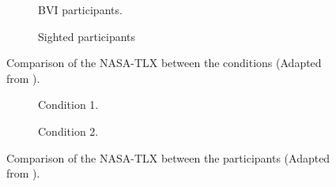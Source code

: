 \begin{figure}[htbp]
    \centering
    \begin{subfigure}{.45\textwidth}
        \centering
        \resizebox{1.1\linewidth}{!}{
        
        }
        \caption{BVI participants.}
        \label{fig:bradley_2005_condition_1}
    \end{subfigure}
    \hfill
    \begin{subfigure}{.45\textwidth}
        \centering
        \resizebox{1.1\linewidth}{!}{
        
        }
        \caption{Sighted participants}
        \label{fig:bradley_2005_condition_2}
    \end{subfigure}
\caption{Comparison of the NASA-TLX between the conditions (Adapted from ).}
\label{fig:bradley_2005_condition}
\end{figure}



\begin{figure}[htbp]
    \centering
    \begin{subfigure}{.49\textwidth}
        \centering
        \resizebox{\linewidth}{!}{
        
        }
        \caption{Condition 1.}
        \label{fig:bradley_2005_nasa_participants_1}
    \end{subfigure}
    \hfill
    \begin{subfigure}{.49\textwidth}
        \centering
        \resizebox{\linewidth}{!}{
        
        }
        \caption{Condition 2.}
        \label{fig:bradley_2005_nasa_participants_2}
    \end{subfigure}
\caption{Comparison of the NASA-TLX between the participants (Adapted from ).}
\label{fig:bradley_2005_participants}
\end{figure}


